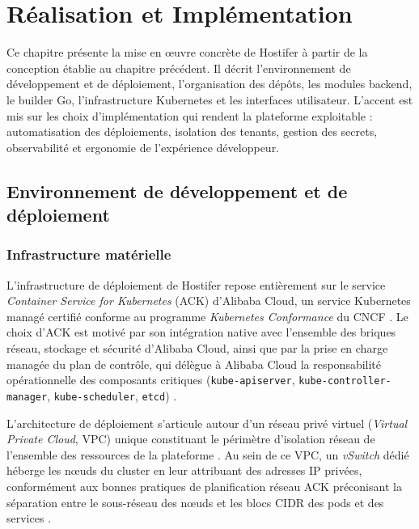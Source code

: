 \chapter{Réalisation et Implémentation}

Ce chapitre présente la mise en œuvre concrète de Hostifer à partir de la conception établie au chapitre précédent. Il décrit l'environnement de développement et de déploiement, l'organisation des dépôts, les modules backend, le builder Go, l'infrastructure Kubernetes et les interfaces utilisateur. L'accent est mis sur les choix d'implémentation qui rendent la plateforme exploitable : automatisation des déploiements, isolation des tenants, gestion des secrets, observabilité et ergonomie de l'expérience développeur.

\section{Environnement de développement et de déploiement}



\subsection{Infrastructure matérielle}

L'infrastructure de déploiement de Hostifer repose entièrement sur le service \textit{Container Service for Kubernetes} (ACK) d'Alibaba Cloud, un service Kubernetes managé certifié conforme au programme \textit{Kubernetes Conformance} du CNCF \cite{ack-overview}. Le choix d'ACK est motivé par son intégration native avec l'ensemble des briques réseau, stockage et sécurité d'Alibaba Cloud, ainsi que par la prise en charge managée du plan de contrôle, qui délègue à Alibaba Cloud la responsabilité opérationnelle des composants critiques (\texttt{kube-apiserver}, \texttt{kube-controller-manager}, \texttt{kube-scheduler}, \texttt{etcd}) \cite{ack-ha}.

L'architecture de déploiement s'articule autour d'un réseau privé virtuel (\textit{Virtual Private Cloud}, VPC) unique constituant le périmètre d'isolation réseau de l'ensemble des ressources de la plateforme \cite{alibaba-vpc}. Au sein de ce VPC, un \textit{vSwitch} dédié héberge les nœuds du cluster en leur attribuant des adresses IP privées, conformément aux bonnes pratiques de planification réseau ACK préconisant la séparation entre le sous-réseau des nœuds et les blocs CIDR des pods et des services \cite{ack-network}.

